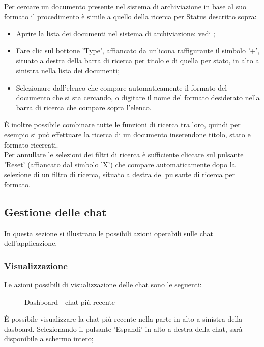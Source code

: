 \documentclass[10pt, a4paper]{article}
\begin{document}
Per cercare un documento presente nel sistema di archiviazione in base al suo formato il procedimento è simile a quello della ricerca per Status descritto sopra:
\begin{itemize}
    \item Aprire la lista dei documenti nel sistema di archiviazione: vedi ;
    \item Fare clic sul bottone 'Type', affiancato da un'icona raffigurante il simbolo '+', situato a destra della barra di ricerca per titolo e di quella per stato, in alto a sinistra nella lista dei documenti;
    \item Selezionare dall'elenco che compare automaticamente il formato del documento che si sta cercando, o digitare il nome del formato desiderato nella barra di ricerca che compare sopra l'elenco.
\end{itemize}
È inoltre possibile combinare tutte le funzioni di ricerca tra loro, quindi per esempio si può effettuare la ricerca di un documento inserendone titolo, stato e formato ricercati. \\ Per annullare le selezioni dei filtri di ricerca è sufficiente cliccare sul pulsante 'Reset' (affiancato dal simbolo 'X') che compare automaticamente dopo la selezione di un filtro di ricerca, situato a destra del pulsante di ricerca per formato.



\subsection{Gestione delle chat}
In questa sezione si illustrano le possibili azioni operabili sulle chat dell'applicazione. 
\subsubsection{Visualizzazione}
Le azioni possibili di visualizzazione delle chat sono le seguenti:
    \begin{figure}[H]
        \centering  
        \caption{Dashboard - chat più recente}
        \label{img:dashrecentchat}
    \end{figure}
    È possibile visualizzare la chat più recente nella parte in alto a sinistra della dasboard. Selezionando il pulsante 'Espandi' in alto a destra della chat, sarà disponibile a schermo intero;
\end{document}
